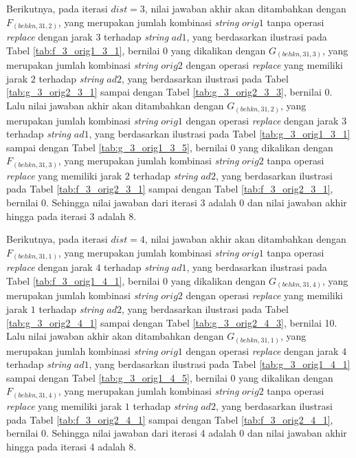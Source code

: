Berikutnya, pada iterasi $ dist = 3 $, nilai jawaban akhir akan ditambahkan dengan $ F_{(behkn, 31,2)} $, yang merupakan jumlah kombinasi \textit{string} $ orig1 $ tanpa operasi \textit{replace} dengan jarak $ 3 $ terhadap \textit{string} $ ad1 $, yang berdasarkan ilustrasi pada Tabel \ref{tab:f_3_orig1_3_1}, bernilai 0 yang dikalikan dengan $ G_{(behkn, 31,3)} $, yang merupakan jumlah kombinasi \textit{string} $ orig2 $ dengan operasi \textit{replace} yang memiliki jarak $ 2 $ terhadap \textit{string} $ ad2 $, yang berdasarkan ilustrasi pada Tabel \ref{tab:g_3_orig2_3_1} sampai dengan Tabel \ref{tab:g_3_orig2_3_3}, bernilai 0. Lalu nilai jawaban akhir akan ditambahkan dengan $ G_{(behkn, 31,2)} $, yang merupakan jumlah kombinasi \textit{string} $ orig1 $ dengan operasi \textit{replace} dengan jarak $ 3 $ terhadap \textit{string} $ ad1 $, yang berdasarkan ilustrasi pada Tabel \ref{tab:g_3_orig1_3_1} sampai dengan Tabel \ref{tab:g_3_orig1_3_5}, bernilai 0 yang dikalikan dengan $ F_{(behkn, 31,3)} $, yang merupakan jumlah kombinasi \textit{string} $ orig2 $ tanpa operasi \textit{replace} yang memiliki jarak $ 2 $ terhadap \textit{string} $ ad2 $, yang berdasarkan ilustrasi pada Tabel \ref{tab:f_3_orig2_3_1} sampai dengan Tabel \ref{tab:f_3_orig2_3_1}, bernilai 0. Sehingga nilai jawaban dari iterasi 3 adalah 0 dan nilai jawaban akhir hingga pada iterasi 3 adalah 8.

Berikutnya, pada iterasi $ dist = 4 $, nilai jawaban akhir akan ditambahkan dengan $ F_{(behkn, 31,1)} $, yang merupakan jumlah kombinasi \textit{string} $ orig1 $ tanpa operasi \textit{replace} dengan jarak $ 4 $ terhadap \textit{string} $ ad1 $, yang berdasarkan ilustrasi pada Tabel \ref{tab:f_3_orig1_4_1}, bernilai 0 yang dikalikan dengan $ G_{(behkn, 31,4)} $, yang merupakan jumlah kombinasi \textit{string} $ orig2 $ dengan operasi \textit{replace} yang memiliki jarak $ 1 $ terhadap \textit{string} $ ad2 $, yang berdasarkan ilustrasi pada Tabel \ref{tab:g_3_orig2_4_1} sampai dengan Tabel \ref{tab:g_3_orig2_4_3}, bernilai 10. Lalu nilai jawaban akhir akan ditambahkan dengan $ G_{(behkn, 31,1)} $, yang merupakan jumlah kombinasi \textit{string} $ orig1 $ dengan operasi \textit{replace} dengan jarak $ 4 $ terhadap \textit{string} $ ad1 $, yang berdasarkan ilustrasi pada Tabel \ref{tab:g_3_orig1_4_1} sampai dengan Tabel \ref{tab:g_3_orig1_4_5}, bernilai 0 yang dikalikan dengan $ F_{(behkn, 31,4)} $, yang merupakan jumlah kombinasi \textit{string} $ orig2 $ tanpa operasi \textit{replace} yang memiliki jarak $ 1 $ terhadap \textit{string} $ ad2 $, yang berdasarkan ilustrasi pada Tabel \ref{tab:f_3_orig2_4_1} sampai dengan Tabel \ref{tab:f_3_orig2_4_1}, bernilai 0. Sehingga nilai jawaban dari iterasi 4 adalah 0 dan nilai jawaban akhir hingga pada iterasi 4 adalah 8.

